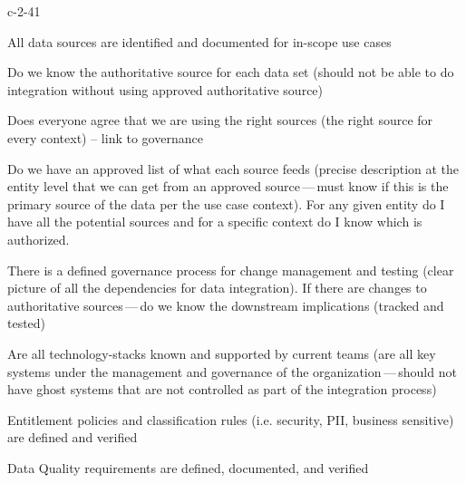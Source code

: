 \begin{level-assessment}{c-2-4}{1}

    \item All data sources are identified and documented for in-scope use cases
    \item Do we know the authoritative source for each data set (should not be able to do integration without
          using approved authoritative source)
    \item Does everyone agree that we are using the right sources (the right source for every context) --
          link to governance
    \item Do we have an approved list of what each source feeds (precise description at the entity level that
          we can get from an approved source\,---\,must know if this is the primary source of the data per the
          use case context).
          For any given entity do I have all the potential sources and for a specific context do I know which
          is authorized.
    \item There is a defined governance process for change management and testing (clear picture of all the
          dependencies for data integration).
          If there are changes to authoritative sources\,---\,do we know the downstream implications (tracked and tested)
    \item Are all \glspl{technology-stack} known and supported by current teams (are all key systems under the
          management and governance of the organization\,---\,should not have ghost systems that are not controlled
          as part of the integration process)
    \item Entitlement policies and classification rules (i.e. security, PII,
          business sensitive) are defined and verified
    \item Data Quality requirements are defined, documented, and verified

\end{level-assessment}

